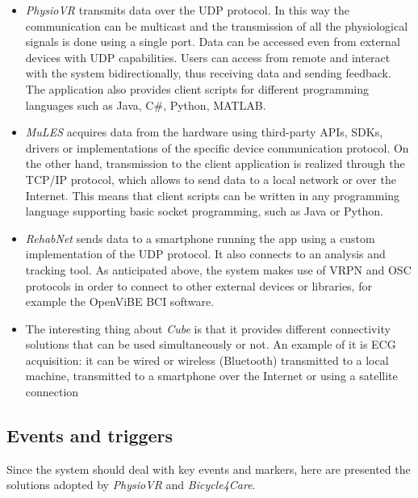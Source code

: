 \documentclass[binding=0.6cm,LaM]{sapthesis}
\begin{document}
\begin{itemize}

\item \textit{PhysioVR} transmits data over the UDP protocol. In this way the communication can be multicast and the transmission of all the physiological signals is done using a single port. Data can be accessed even from external devices with UDP capabilities. Users can access from remote and interact with the system bidirectionally, thus receiving data and sending feedback. The application also provides client scripts for different programming languages such as Java, C\#, Python, MATLAB.

\item \textit{MuLES} acquires data from the hardware using third-party APIs, SDKs, drivers or implementations of the specific device communication protocol. On the other hand, transmission to the client application is realized through the TCP/IP protocol, which allows to send data to a local network or over the Internet.
This means that client scripts can be written in any programming language supporting basic socket programming, such as Java or Python.

\item \textit{RehabNet} sends data to a smartphone running the app using a custom implementation of the UDP protocol. It also connects to an analysis and tracking tool. As anticipated above, the system makes use of VRPN and OSC protocols in order to connect to other external devices or libraries, for example the OpenViBE BCI software.

\item The interesting thing about \textit{Cube} is that it provides different connectivity solutions that can be used simultaneously or not. An example of it is ECG acquisition: it can be wired or wireless (Bluetooth) transmitted to a local machine, transmitted to a smartphone over the Internet or using a satellite connection

\end{itemize}

\subsection{Events and triggers}
Since the system should deal with key events and markers, here are presented the solutions adopted by \textit{PhysioVR} and \textit{Bicycle4Care}.
\end{document}
